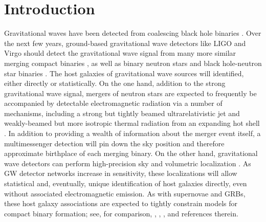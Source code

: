 \documentclass[nofootinbib,twocolumn,prd]{emulateapj}
\begin{document}
\section{Introduction}
Gravitational waves have been detected from  coalescing  black hole binaries \citep{DetectionPaper,LIGO-O1-BBH}. 
Over the next few years, ground-based gravitational wave detectors like LIGO 
and Virgo  should detect the gravitational
wave signal from many more similar merging compact binaries \citep{LIGO-O1-BBH,RatesPaper,gwastro-EventPopsynPaper-2016}, as well as  binary  neutron stars and black hole-neutron star binaries \citep{LIGO-Inspiral-Rates,popsyn-LowMetallicityImpact2c-StarTrackRevised-2014}.
%
The host galaxies of gravitational wave sources will identified, either directly or statistically.  
On the one hand, addition to the strong gravitational wave signal, mergers of neutron stars are expected to  frequently be accompanied by detectable
electromagnetic radiation  via a number of  mechanisms, including a strong but tightly beamed
ultrarelativistic jet and weakly-beamed but more isotropic thermal radiation from an expanding hot shell
\citep[see,e.g.,][and references therein]{2013PhRvL.111r1101C,short-grb-GWCoincidenceEM-MetzgerBerger2011}.  
In addition to providing a wealth of information about the merger event itself, a multimessenger detection will pin down
the sky position and therefore approximate birthplace of each merging binary.    
%
On the other hand, gravitational wave detectors can perform high-precision sky and volumetric localization \cite{2016LRR....19....1A,2016arXiv160307333S}.  As GW detector
networks increase in sensitivity, these localizations will allow statistical and, eventually, unique identification of
host galaxies directly, even without associated electromagnetic emission.
%
As with supernovae and  GRBs, these host galaxy associations   are expected to tightly constrain models for compact binary
formation; see, for comparison,  \citet{2011MNRAS.412.1508M}, \citet{long-grb-GuettaPiran2007},
\citet{2014ARAA..52...43B}, and references therein. %
%
\end{document}
